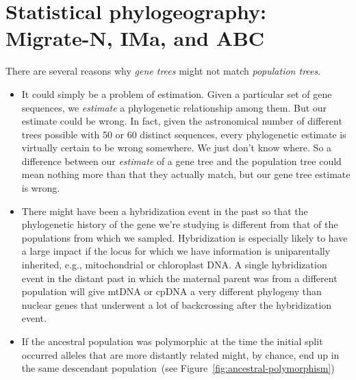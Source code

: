 \chapter{Statistical phylogeography: Migrate-N, IMa, and ABC}

There are several reasons why {\it gene trees\/} might not match {\it
  population trees}.

\begin{itemize}

\item It could simply be a problem of estimation. Given a particular
  set of gene sequences, we {\it estimate} a phylogenetic relationship
  among them. But our estimate could be wrong. In fact, given the
  astronomical number of different trees possible with 50 or 60
  distinct sequences, every phylogenetic estimate is virtually certain
  to be wrong somewhere. We just don't know where. So a difference
  between our {\it estimate\/} of a gene tree and the population tree
  could mean nothing more than that they actually match, but our gene
  tree estimate is wrong.

\item There might have been a hybridization event in the past so that
  the phylogenetic history of the gene we're studying is different
  from that of the populations from which we sampled. Hybridization is
  especially likely to have a large impact if the locus for which we
  have information is uniparentally inherited, e.g., mitochondrial or
  chloroplast DNA. A single hybridization event in the distant past in
  which the maternal parent was from a different population will give
  mtDNA or cpDNA a very different phylogeny than nuclear genes that
  underwent a lot of backcrossing after the hybridization event.

\item If the ancestral population was polymorphic at the time the
  initial split occurred alleles that are more distantly related
  might, by chance, end up in the same descendant population~(see
  Figure~\ref{fig:ancestral-polymorphism})

\end{itemize}

